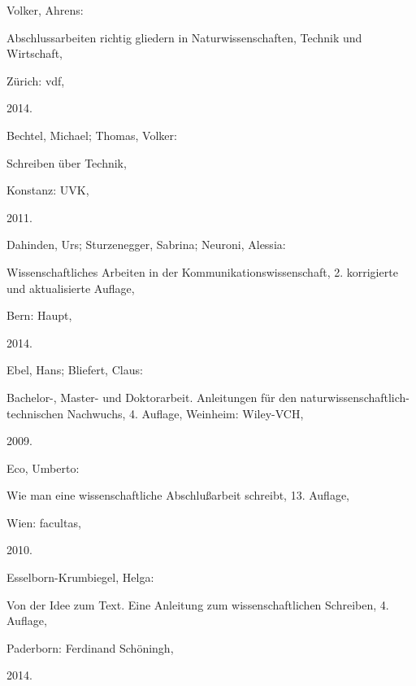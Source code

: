 \documentclass[a4paper,11pt]{article}%
\renewcommand{\\}{\vspace*{0.5\baselineskip} \newline}
\begin{document}
\begin{thebibliography}{1}

	


	Volker, Ahrens: 

	Abschlussarbeiten richtig gliedern in Naturwissenschaften, Technik und Wirtschaft,

	Zürich: vdf, 

	2014.

	


	Bechtel, Michael; Thomas, Volker:

	Schreiben über Technik,

	Konstanz: UVK,

	2011.

	


	Dahinden, Urs; Sturzenegger, Sabrina; Neuroni, Alessia:

	Wissenschaftliches Arbeiten in der Kommunikationswissenschaft, 2. korrigierte und aktualisierte Auflage, 

	Bern: Haupt,

	2014.

	


	Ebel, Hans; Bliefert, Claus: 

	Bachelor-, Master- und Doktorarbeit. Anleitungen für den naturwissenschaftlich-technischen Nachwuchs, 4. Auflage, Weinheim: Wiley-VCH,

	2009.

	


	Eco, Umberto: 

	Wie man eine wissenschaftliche Abschlußarbeit schreibt, 13. Auflage,

	Wien: facultas,

	2010.

	


	Esselborn-Krumbiegel, Helga: 

	Von der Idee zum Text. Eine Anleitung zum wissenschaftlichen Schreiben, 4. Auflage,

	Paderborn: Ferdinand Schöningh,

	2014.

	


\end{thebibliography}
\end{document}
